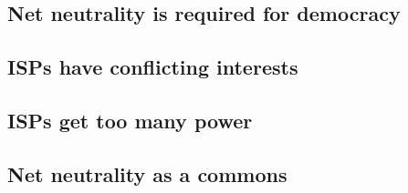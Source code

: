 

\subsection{Net neutrality is required for democracy}


\subsection{\acp{ISP} have conflicting interests}

\subsection{\acp{ISP} get too many power}

\subsection{Net neutrality as a commons}

